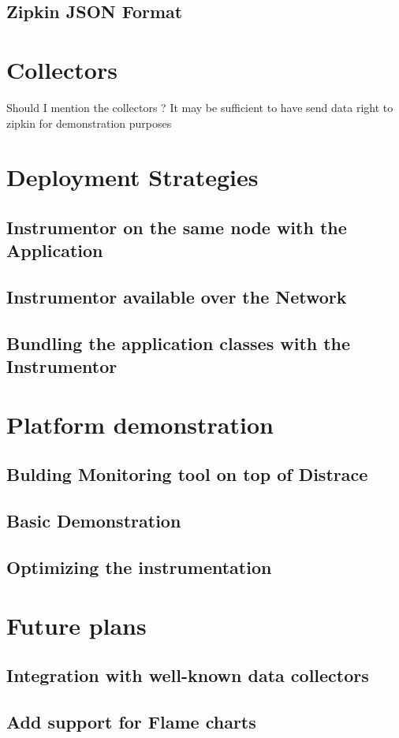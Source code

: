 \documentclass[12pt,a4paper]{report}
\begin{document}
\section{Zipkin JSON Format}
\chapter{Collectors}
Should I mention the collectors ? It may be sufficient to have send data right to zipkin for demonstration purposes
\chapter{Deployment Strategies}
\section{Instrumentor on the same node with the Application}
\section{Instrumentor available over the Network}
\section{Bundling the application classes with the Instrumentor}
\chapter{Platform demonstration}
\section{Bulding Monitoring tool on top of Distrace}
\section{Basic Demonstration}
\section{Optimizing the instrumentation}
\chapter{Future plans}
\section{Integration with well-known data collectors}
\section{Add support for Flame charts}
\end{document}
